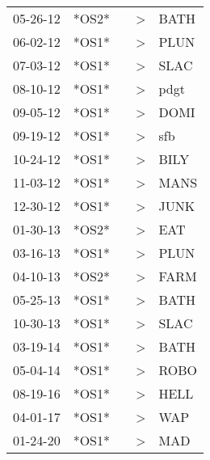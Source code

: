 \begin{supertabular}{lllll}
 05-26-12 &  *OS2* &   &  \textgreater &  BATH \\
 06-02-12 &  *OS1* &   &  \textgreater &  PLUN \\
 07-03-12 &  *OS1* &   &  \textgreater &  SLAC \\
 08-10-12 &  *OS1* &   &  \textgreater &  pdgt \\
 09-05-12 &  *OS1* &   &  \textgreater &  DOMI \\
 09-19-12 &  *OS1* &   &  \textgreater &   sfb \\
 10-24-12 &  *OS1* &   &  \textgreater &  BILY \\
 11-03-12 &  *OS1* &   &  \textgreater &  MANS \\
 12-30-12 &  *OS1* &   &  \textgreater &  JUNK \\
 01-30-13 &  *OS2* &   &  \textgreater &   EAT \\
 03-16-13 &  *OS1* &   &  \textgreater &  PLUN \\
 04-10-13 &  *OS2* &   &  \textgreater &  FARM \\
 05-25-13 &  *OS1* &   &  \textgreater &  BATH \\
 10-30-13 &  *OS1* &   &  \textgreater &  SLAC \\
 03-19-14 &  *OS1* &   &  \textgreater &  BATH \\
 05-04-14 &  *OS1* &   &  \textgreater &  ROBO \\
 08-19-16 &  *OS1* &   &  \textgreater &  HELL \\
 04-01-17 &  *OS1* &   &  \textgreater &   WAP \\
 01-24-20 &  *OS1* &   &  \textgreater &   MAD \\
\end{supertabular}

